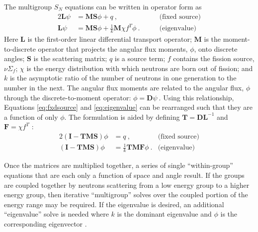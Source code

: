 \documentclass[preprint,12pt]{elsarticle}
\newcommand{\Macro}{\ensuremath{\Sigma}}
\newcommand{\ve}[1]{\ensuremath{\mathbf{#1}}}
\begin{document}
%
The multigroup $S_N$ equations can be written in operator form as
%
\begin{alignat}{2}
  \ve{L}\psi &= \ve{MS}\phi + q \:, \qquad &\text{(fixed source)} \label{eq:fxdsource} \\
  \ve{L}\psi &= \ve{MS}\phi + \frac{1}{k}\ve{M}\chi f^{T}\phi \:. \qquad &\text{(eigenvalue)} \label{eq:eigenvalue}
\end{alignat}
%
Here $\ve{L}$ is the first-order linear differential transport operator; $\ve{M}$ is the moment-to-discrete operator that projects the angular flux moments, $\phi$, onto discrete angles; $\ve{S}$ is the scattering matrix; $q$ is a source term; $f$ contains the fission source, $\nu \Macro_{f}$; $\chi$ is the energy distribution with which neutrons are born out of fission; and $k$ is the asymptotic ratio of the number of neutrons in one generation to the number in the next. The angular flux moments are related to the angular flux, $\phi$ through the discrete-to-moment operator: $\phi = \mathbf{D} \psi \:$. Using this relationship, Equations \eqref{eq:fxdsource} and \eqref{eq:eigenvalue} can be rearranged such that they are a function of only $\phi$. The formulation is aided by defining $\ve{T} = \ve{DL}^{-1}$ and $\ve{F} = \chi f^{T}$ \cite{Evans2011}:
%
\begin{alignat}{2}
  (\ve{I} - \ve{TMS})\phi &= q \:, \qquad &\text{(fixed source)} \label{eq:OperatorFxdForm} \\
  (\ve{I} - \ve{TMS})\phi &= \frac{1}{k} \ve{TMF} \phi \:. &\text{(eigenvalue)} \label{eq:OperatorEvalForm}
\end{alignat}

Once the matrices are multiplied together, a series of single ``within-group'' equations that are each only a function of space and angle result. If the groups are coupled together by neutrons scattering from a low energy group to a higher energy group, then iterative ``multigroup'' solves over the coupled portion of the energy range may be required. If the eigenvalue is desired, an additional ``eigenvalue'' solve is needed where $k$ is the dominant eigenvalue and $\phi$ is the corresponding eigenvector \cite{Evans2009}. 

\end{document}
